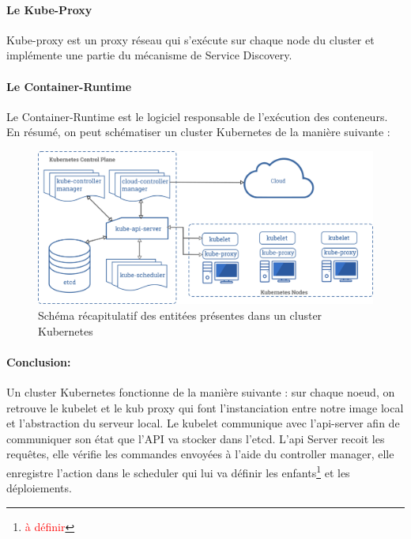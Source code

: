 \documentclass[11pt,fleqn]{book} %
\begin{document}
\paragraph{Le Kube-Proxy}
Kube-proxy est un proxy réseau qui s’exécute sur chaque node du cluster et implémente une partie du mécanisme de Service Discovery.

\paragraph{Le Container-Runtime}
Le Container-Runtime est le logiciel responsable de l’exécution des conteneurs.\\


En résumé, on peut schématiser un cluster Kubernetes de la manière suivante :

\begin{figure}[H]\centering
\renewcommand{\figurename}{Graphique}
\includegraphics[scale=0.1]{Pictures/Comparaison/Kubernetes-cluster-archi.png}
\captionsetup{margin=1.5cm,format=hang,justification=justified}
\caption[]{Schéma récapitulatif des entitées présentes dans un cluster Kubernetes \newline}
\end{figure}



\begin{interrupt}
\paragraph{Conclusion:}
Un cluster Kubernetes fonctionne de la manière suivante :
sur chaque noeud, on retrouve le kubelet et le kub proxy qui font l'instanciation entre notre image local et l'abstraction du serveur local. Le kubelet communique avec l'api-server afin de communiquer son état que l'API va stocker dans l'etcd.
L'api Server recoit les requêtes, elle vérifie les commandes envoyées à l'aide du controller manager, elle enregistre l'action dans le scheduler qui lui va définir les enfants\footnote{\textcolor{red}{à définir}} et les déploiements.
\end{interrupt}
\end{document}
